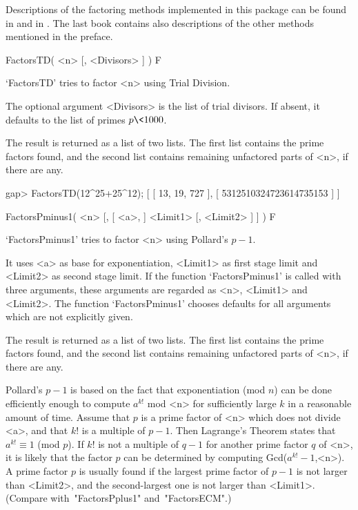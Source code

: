 

Descriptions of the factoring methods implemented in this package can
be found in \cite{Bressoud89} and in \cite{Cohen93}.
The last book contains also descriptions of the other methods mentioned
in the preface.


\>FactorsTD( <n> [, <Divisors> ] ) F

`FactorsTD' tries to factor <n> using Trial Division.

The optional argument <Divisors> is the list of trial divisors.
If absent, it defaults to the list of primes $p \< 1000$.

The result is returned as a list of two lists. The first list
contains the prime factors found, and the second list contains
remaining unfactored parts of <n>, if there are any.

\beginexample
gap> FactorsTD(12^25+25^12);
[ [ 13, 19, 727 ], [ 5312510324723614735153 ] ]
\endexample


\>FactorsPminus1( <n> [, [ <a>, ] <Limit1> [, <Limit2> ] ] ) F

`FactorsPminus1' tries to factor <n> using Pollard's $p-1$.

It uses <a> as base for exponentiation, <Limit1> as first stage limit
and <Limit2> as second stage limit.
If the function `FactorsPminus1' is called with three arguments,
these arguments are regarded as <n>, <Limit1> and <Limit2>.
The function `FactorsPminus1' chooses defaults for all arguments
which are not explicitly given.

The result is returned as a list of two lists. The first list
contains the prime factors found, and the second list contains
remaining unfactored parts of <n>, if there are any.

Pollard's $p-1$ is based on the fact that exponentiation (mod $n$)
can be done efficiently enough to compute $a^{k!}$ mod <n> for
sufficiently large $k$ in a reasonable amount of time.
Assume that $p$ is a prime factor of <n> which does not divide <a>,
and that $k!$ is a multiple of $p-1$. Then
Lagrange's Theorem states that $a^{k!} \equiv 1$ (mod $p$).
If $k!$ is not a multiple of $q-1$ for another prime factor $q$ of <n>,
it is likely that the factor $p$ can be determined by computing
Gcd($a^{k!}-1$,<n>).
A prime factor $p$ is usually found if the largest prime factor
of $p-1$ is not larger than <Limit2>, and the second-largest one
is not larger than <Limit1>.
(Compare with~"FactorsPplus1" and~"FactorsECM".)


